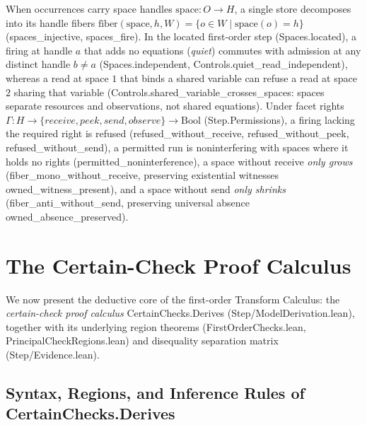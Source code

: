 \documentclass[11pt,a4paper]{article}
\theoremstyle{definition}
\DeclareRobustCommand{\lean}[1]{%
  \ifmmode\text{\normalfont\ttfamily\footnotesize\detokenize{#1}}%
  \else{\normalfont\footnotesize\leanurl{#1}}\fi}
\DeclareRobustCommand{\metta}[1]{\text{\normalfont\ttfamily\footnotesize #1}}
\def\lean#1{#1}%
\def\metta#1{#1}%
\begin{document}
\begin{enumerate}[leftmargin=2em, nosep]
  When occurrences carry space handles $\mathrm{space} : O \to H$, a single store decomposes into its handle fibers $\mathrm{fiber}(\mathrm{space}, h, W) = \{o \in W \mid \mathrm{space}(o) = h\}$ (\lean{spaces_injective}, \lean{spaces_fire}). In the located first-order step (\lean{Spaces.located}), a firing at handle $a$ that adds no equations (\emph{quiet}) commutes with admission at any distinct handle $b \neq a$ (\lean{Spaces.independent}, \lean{Controls.quiet_read_independent}), whereas a read at space $1$ that binds a shared variable can refuse a read at space $2$ sharing that variable (\lean{Controls.shared_variable_crosses_spaces}: spaces separate resources and observations, not shared equations). Under facet rights $\Gamma : H \to \{\metta{receive}, \metta{peek}, \metta{send}, \metta{observe}\} \to \mathrm{Bool}$ (\lean{Step.Permissions}), a firing lacking the required right is refused (\lean{refused_without_receive}, \lean{refused_without_peek}, \lean{refused_without_send}), a permitted run is noninterfering with spaces where it holds no rights (\lean{permitted_noninterference}), a space without \metta{receive} \emph{only grows} (\lean{fiber_mono_without_receive}, preserving existential witnesses \lean{owned_witness_present}), and a space without \metta{send} \emph{only shrinks} (\lean{fiber_anti_without_send}, preserving universal absence \lean{owned_absence_preserved}).
\end{enumerate}

\section{The Certain-Check Proof Calculus}
\label{sec:certain-checks}

We now present the deductive core of the first-order Transform Calculus: the \emph{certain-check proof calculus} \lean{CertainChecks.Derives} (\lean{Step/ModelDerivation.lean}), together with its underlying region theorems (\lean{FirstOrderChecks.lean}, \lean{PrincipalCheckRegions.lean}) and disequality separation matrix (\lean{Step/Evidence.lean}).

\subsection{Syntax, Regions, and Inference Rules of \lean{CertainChecks.Derives}}
\end{document}

